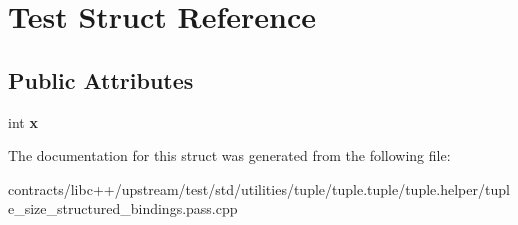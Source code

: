 \hypertarget{struct_test}{}\section{Test Struct Reference}
\label{struct_test}
\subsection*{Public Attributes}
\begin{DoxyCompactItemize}
\item 
\mbox{\label{struct_test_a1ba496b528ad0a8180dbac57e4f1048a}} 
int {\bfseries x}
\end{DoxyCompactItemize}


The documentation for this struct was generated from the following file\+:\begin{DoxyCompactItemize}
\item 
contracts/libc++/upstream/test/std/utilities/tuple/tuple.\+tuple/tuple.\+helper/tuple\+\_\+size\+\_\+structured\+\_\+bindings.\+pass.\+cpp\end{DoxyCompactItemize}
